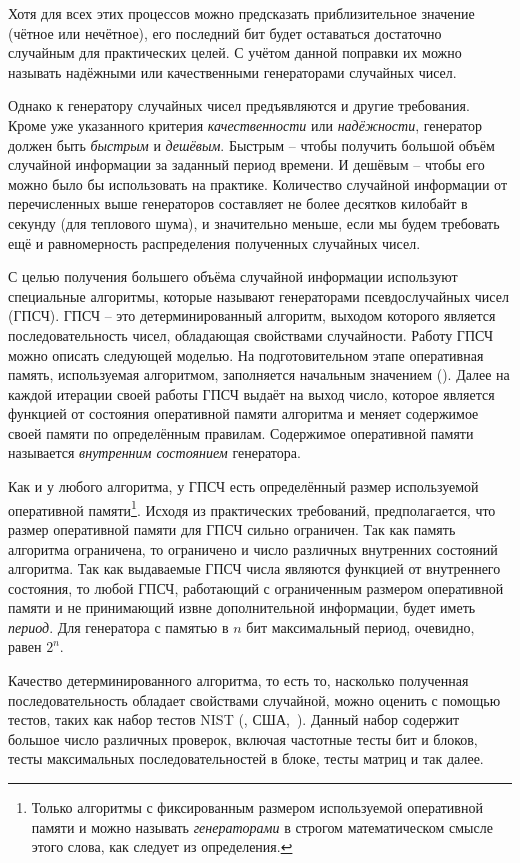 Хотя для всех этих процессов можно предсказать приблизительное значение (чётное или нечётное), его последний бит будет оставаться достаточно случайным для практических целей. С учётом данной поправки их можно называть надёжными или качественными генераторами случайных чисел.

Однако к генератору случайных чисел предъявляются и другие требования. Кроме уже указанного критерия \emph{качественности} или \emph{надёжности}, генератор должен быть \emph{быстрым} и \emph{дешёвым}. Быстрым -- чтобы получить большой объём случайной информации за заданный период времени. И дешёвым -- чтобы его можно было бы использовать на практике. Количество случайной информации от перечисленных выше генераторов составляет не более десятков килобайт в секунду (для теплового шума), и значительно меньше, если мы будем требовать ещё и равномерность распределения полученных случайных чисел.

С целью получения большего объёма случайной информации используют специальные алгоритмы, которые называют генераторами псевдослучайных чисел (ГПСЧ). ГПСЧ -- это детерминированный алгоритм, выходом которого является последовательность чисел, обладающая свойствами случайности. Работу ГПСЧ можно описать следующей моделью. На подготовительном этапе оперативная память, используемая алгоритмом, заполняется начальным значением (). Далее на каждой итерации своей работы ГПСЧ выдаёт на выход число, которое является функцией от состояния оперативной памяти алгоритма и меняет содержимое своей памяти по определённым правилам. Содержимое оперативной памяти называется \emph{внутренним состоянием} генератора.

Как и у любого алгоритма, у ГПСЧ есть определённый размер используемой оперативной памяти\footnote{Только алгоритмы с фиксированным размером используемой оперативной памяти и можно называть \emph{генераторами} в строгом математическом смысле этого слова, как следует из определения.}. Исходя из практических требований, предполагается, что размер оперативной памяти для ГПСЧ сильно ограничен. Так как память алгоритма ограничена, то ограничено и число различных внутренних состояний алгоритма. Так как выдаваемые ГПСЧ числа являются функцией от внутреннего состояния, то любой ГПСЧ, работающий с ограниченным размером оперативной памяти и не принимающий извне дополнительной информации, будет иметь \emph{период}. Для генератора с памятью в $n$ бит максимальный период, очевидно, равен $2^n$.

Качество детерминированного алгоритма, то есть то, насколько полученная последовательность обладает свойствами случайной, можно оценить с помощью тестов, таких как набор тестов NIST (, США,~\cite{NIST:2001}). Данный набор содержит большое число различных проверок, включая частотные тесты бит и блоков, тесты максимальных последовательностей в блоке, тесты матриц и так далее.

